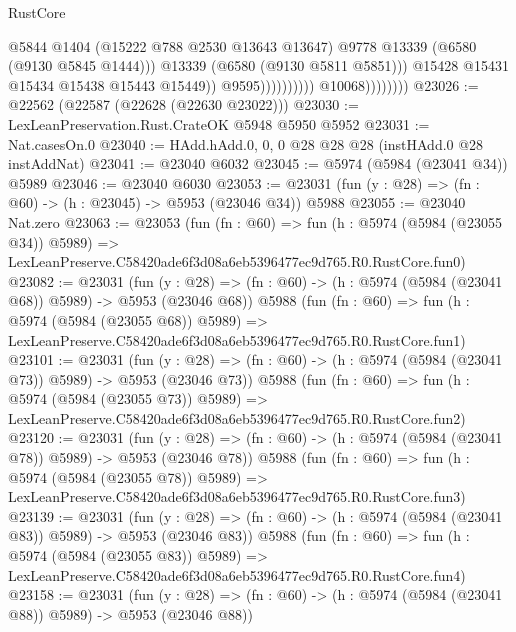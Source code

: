 \begin{lexlean}{RustCore}
\begin{coremodule}
                                                @5844
                                                @1404
                                                (@15222 @788 @2530 @13643 @13647)
                                                @9778
                                                @13339
                                                (@6580 (@9130 @5845 @1444)))
                                              @13339
                                              (@6580 (@9130 @5811 @5851)))
                                            @15428
                                            @15431
                                            @15434
                                            @15438
                                            @15443
                                            @15449))
                                        @9595))))))))))
                    @10068))))))))
@23026 := @22562 (@22587 (@22628 (@22630 @23022)))
@23030 := LexLeanPreservation.Rust.CrateOK @5948 @5950 @5952
@23031 := Nat.casesOn.{0}
@23040 := HAdd.hAdd.{0, 0, 0} @28 @28 @28 (instHAdd.{0} @28 instAddNat)
@23041 := @23040 @6032
@23045 := @5974 (@5984 (@23041 @34)) @5989
@23046 := @23040 @6030
@23053 := @23031 (fun (y : @28) => (fn : @60) -> (h : @23045) -> @5953 (@23046 @34)) @5988
@23055 := @23040 Nat.zero
@23063 := @23053
    (fun (fn : @60) =>
    fun (h : @5974 (@5984 (@23055 @34)) @5989) =>
    LexLeanPreserve.C58420ade6f3d08a6eb5396477ec9d765.R0.RustCore.fun0)
@23082 := @23031
    (fun (y : @28) => (fn : @60) -> (h : @5974 (@5984 (@23041 @68)) @5989) -> @5953 (@23046 @68))
    @5988
    (fun (fn : @60) =>
    fun (h : @5974 (@5984 (@23055 @68)) @5989) =>
    LexLeanPreserve.C58420ade6f3d08a6eb5396477ec9d765.R0.RustCore.fun1)
@23101 := @23031
    (fun (y : @28) => (fn : @60) -> (h : @5974 (@5984 (@23041 @73)) @5989) -> @5953 (@23046 @73))
    @5988
    (fun (fn : @60) =>
    fun (h : @5974 (@5984 (@23055 @73)) @5989) =>
    LexLeanPreserve.C58420ade6f3d08a6eb5396477ec9d765.R0.RustCore.fun2)
@23120 := @23031
    (fun (y : @28) => (fn : @60) -> (h : @5974 (@5984 (@23041 @78)) @5989) -> @5953 (@23046 @78))
    @5988
    (fun (fn : @60) =>
    fun (h : @5974 (@5984 (@23055 @78)) @5989) =>
    LexLeanPreserve.C58420ade6f3d08a6eb5396477ec9d765.R0.RustCore.fun3)
@23139 := @23031
    (fun (y : @28) => (fn : @60) -> (h : @5974 (@5984 (@23041 @83)) @5989) -> @5953 (@23046 @83))
    @5988
    (fun (fn : @60) =>
    fun (h : @5974 (@5984 (@23055 @83)) @5989) =>
    LexLeanPreserve.C58420ade6f3d08a6eb5396477ec9d765.R0.RustCore.fun4)
@23158 := @23031
    (fun (y : @28) => (fn : @60) -> (h : @5974 (@5984 (@23041 @88)) @5989) -> @5953 (@23046 @88))

\end{coremodule}
\end{lexlean}
